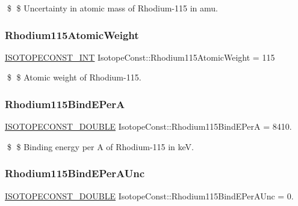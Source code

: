 \$ \$ Uncertainty in atomic mass of Rhodium-\/115 in amu. \mbox{\label{group___isotope_const-_rhodium-_rh115_gadb524219cefbd8ed830cecf10bdb69db}} 
\subsubsection{\texorpdfstring{Rhodium115\+Atomic\+Weight}{Rhodium115AtomicWeight}}
{\footnotesize\ttfamily \mbox{\hyperlink{group___isotope_const-_macros_ga5f18360b3e99483a35c32d789e62621c}{I\+S\+O\+T\+O\+P\+E\+C\+O\+N\+S\+T\+\_\+\+I\+NT}} Isotope\+Const\+::\+Rhodium115\+Atomic\+Weight = 115}

\$ \$ Atomic weight of Rhodium-\/115. \mbox{\label{group___isotope_const-_rhodium-_rh115_ga088a3d993d24cbd0a66d0e75b5b5b47d}} 
\subsubsection{\texorpdfstring{Rhodium115\+Bind\+E\+PerA}{Rhodium115BindEPerA}}
{\footnotesize\ttfamily \mbox{\hyperlink{group___isotope_const-_macros_ga8f45a7272ce02c0b4c65c44636ed719a}{I\+S\+O\+T\+O\+P\+E\+C\+O\+N\+S\+T\+\_\+\+D\+O\+U\+B\+LE}} Isotope\+Const\+::\+Rhodium115\+Bind\+E\+PerA = 8410.}

\$ \$ Binding energy per A of Rhodium-\/115 in keV. \mbox{\label{group___isotope_const-_rhodium-_rh115_ga0a61d63623aefc7913013e1f9127d89d}} 
\subsubsection{\texorpdfstring{Rhodium115\+Bind\+E\+Per\+A\+Unc}{Rhodium115BindEPerAUnc}}
{\footnotesize\ttfamily \mbox{\hyperlink{group___isotope_const-_macros_ga8f45a7272ce02c0b4c65c44636ed719a}{I\+S\+O\+T\+O\+P\+E\+C\+O\+N\+S\+T\+\_\+\+D\+O\+U\+B\+LE}} Isotope\+Const\+::\+Rhodium115\+Bind\+E\+Per\+A\+Unc = 0.}

